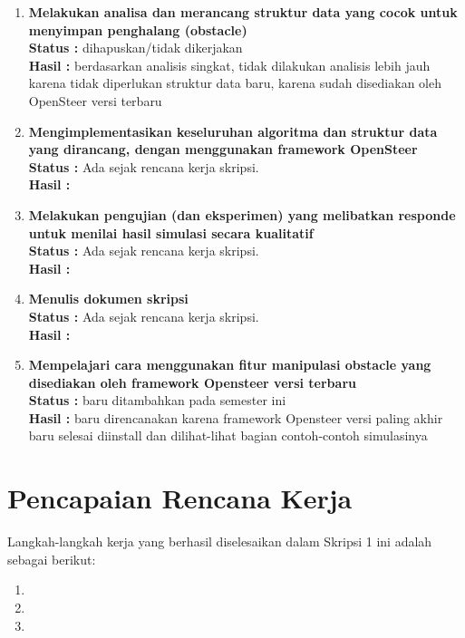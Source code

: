 \documentclass[a4paper,twoside]{article}
\begin{document}
\begin{enumerate}
	\item \textbf{Melakukan analisa dan merancang struktur data yang cocok untuk menyimpan penghalang (obstacle)}\\
	      {\bf Status :} dihapuskan/tidak dikerjakan \\
	      {\bf Hasil :} berdasarkan analisis singkat, tidak dilakukan analisis lebih jauh karena tidak diperlukan struktur data baru, karena sudah disediakan oleh OpenSteer versi terbaru

	\item \textbf{Mengimplementasikan keseluruhan algoritma dan struktur data yang dirancang, dengan menggunakan framework OpenSteer} \\
	      {\bf Status :} Ada sejak rencana kerja skripsi.\\
	      {\bf Hasil :}

	\item \textbf{Melakukan pengujian (dan eksperimen) yang melibatkan responde untuk menilai hasil simulasi secara kualitatif}\\
	      {\bf Status :} Ada sejak rencana kerja skripsi.\\
	      {\bf Hasil :}

	\item \textbf{Menulis dokumen skripsi}\\
	      {\bf Status :} Ada sejak rencana kerja skripsi.\\
	      {\bf Hasil :} \lipsum[1]

	\item \textbf{Mempelajari cara menggunakan fitur manipulasi obstacle yang disediakan oleh framework Opensteer versi terbaru}\\
	      {\bf Status :} baru ditambahkan pada semester ini\\
	      {\bf Hasil :} baru direncanakan karena framework Opensteer versi paling akhir baru selesai diinstall dan dilihat-lihat bagian contoh-contoh simulasinya


\end{enumerate}

\section{Pencapaian Rencana Kerja}
Langkah-langkah kerja yang berhasil diselesaikan dalam Skripsi 1 ini adalah sebagai berikut:
\begin{enumerate}
	\item
	\item
	\item
\end{enumerate}
\end{document}
